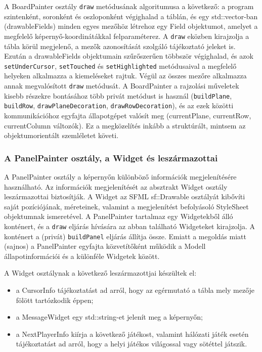 \documentclass[12pt, twoside]{report}
\begin{document}
A BoardPainter osztály {\tt draw} metódusának algoritumusa a következő: a program szintenként, soronként és oszloponként végighalad a táblán, és egy std::vector-ban (drawableFields) minden egyes mezőhöz létrehoz egy Field objektumot, amelyet a megfelelő képernyő-koordinátákkal felparaméterez. A {\tt draw} eközben kirajzolja a tábla körül megjelenő, a mezők azonosítását szolgáló tájékoztató jeleket is. Ezután a drawableFields objektumain szűrőszerűen többször végighalad, és azok {\tt setUnderCursor}, {\tt setTouched} és {\tt setHighlighted} metódusaival a megfelelő helyeken alkalmazza a kiemeléseket rajtuk. Végül az összes mezőre alkalmazza annak megvalósított {\tt draw} metódusát. A BoardPainter a rajzolási műveletek kisebb részekre bontásához több privát metódust is használ ({\tt buildPlane}, {\tt buildRow}, {\tt drawPlaneDecoration}, {\tt drawRowDecoration}), és az ezek közötti kommunikációhoz egyfajta állapotgépet valósít meg (currentPlane, currentRow, currentColumn változók). Ez a megközelítés inkább a struktúrált, mintsem az objektumorientált szemléletet követi.

\subsubsection{A PanelPainter osztály, a Widget és leszármazottai}

A PanelPainter osztály a képernyőn különböző információk megjelenítésére használható. Az információk megjelenítését az absztrakt Widget osztály leszármazottai biztosítják. A Widget az SFML sf::Drawable osztályát kibővíti saját pozíciójának, méreteinek, valamint a megjelenítést befolyásoló StyleSheet objektumnak ismeretével. A PanelPainter tartalmaz egy Widgetekből álló konténert, és a {\tt draw} eljárás hívására az abban található Widgeteket kirajzolja. A konténert a (privát) {\tt buildPanel} eljárás állítja össze. Emiatt a megoldás miatt (sajnos) a PanelPainter egyfajta közvetítőként működik a Modell állapotinformációi és a különféle Widgetek között.

A Widget osztálynak a következő leszármazottjai készültek el:
\begin{itemize}
	\item a CursorInfo tájékoztatást ad arról, hogy az egérmutató a tábla mely mezője fölött tartózkodik éppen;
	\item a MessageWidget egy std::string-et jelenít meg a képernyőn;
	\item a NextPlayerInfo kiírja a következő játékost, valamint hálózati játék esetén tájékoztatást ad arról, hogy a helyi játékos világossal vagy sötéttel játszik.
\end{itemize}
\end{document}
